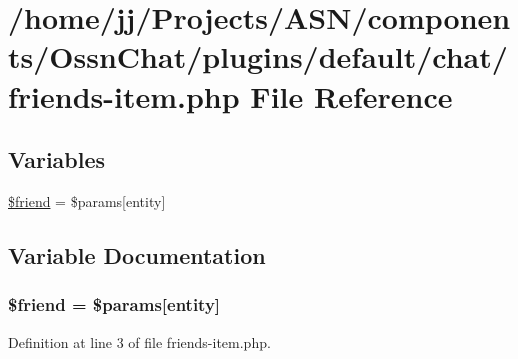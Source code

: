\hypertarget{components_2_ossn_chat_2plugins_2default_2chat_2friends-item_8php}{}\section{/home/jj/\+Projects/\+A\+S\+N/components/\+Ossn\+Chat/plugins/default/chat/friends-\/item.php File Reference}
\label{components_2_ossn_chat_2plugins_2default_2chat_2friends-item_8php}
\subsection*{Variables}
\begin{DoxyCompactItemize}
\item 
\hyperlink{components_2_ossn_chat_2plugins_2default_2chat_2friends-item_8php_a614b5c5dbf84346f452abdd7d0429bce}{\$friend} = \$params\mbox{[}\textquotesingle{}entity\textquotesingle{}\mbox{]}
\end{DoxyCompactItemize}


\subsection{Variable Documentation}
\subsubsection[{\texorpdfstring{\$friend}{$friend}}]{\setlength{\rightskip}{0pt plus 5cm}\$friend = \$params\mbox{[}\textquotesingle{}entity\textquotesingle{}\mbox{]}}\hypertarget{components_2_ossn_chat_2plugins_2default_2chat_2friends-item_8php_a614b5c5dbf84346f452abdd7d0429bce}{}\label{components_2_ossn_chat_2plugins_2default_2chat_2friends-item_8php_a614b5c5dbf84346f452abdd7d0429bce}


Definition at line 3 of file friends-\/item.\+php.

